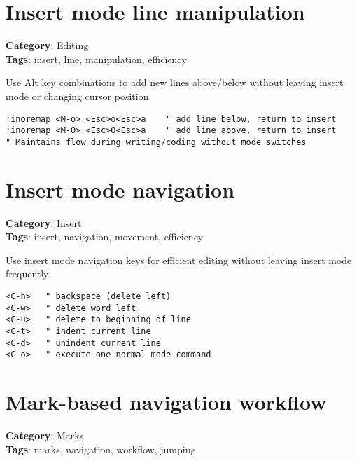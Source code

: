{{{{\section{Insert mode line manipulation}

\textbf{Category}: Editing\\ \textbf{Tags}: insert, line, manipulation, efficiency
\vspace{0.5cm}

Use Alt key combinations to add new lines above/below without leaving insert mode or changing cursor position.

\begin{Exa*}{}
\begin{Verbatim}[fontsize=\footnotesize, breaklines, breakanywhere]
:inoremap <M-o> <Esc>o<Esc>a    " add line below, return to insert
:inoremap <M-O> <Esc>O<Esc>a    " add line above, return to insert
" Maintains flow during writing/coding without mode switches
\end{Verbatim}
\end{Exa*}

\section{Insert mode navigation}

\textbf{Category}: Insert\\ \textbf{Tags}: insert, navigation, movement, efficiency
\vspace{0.5cm}

Use insert mode navigation keys for efficient editing without leaving insert mode frequently.

\begin{Exa*}{}
\begin{Verbatim}[fontsize=\footnotesize, breaklines, breakanywhere]
<C-h>   " backspace (delete left)
<C-w>   " delete word left  
<C-u>   " delete to beginning of line
<C-t>   " indent current line
<C-d>   " unindent current line
<C-o>   " execute one normal mode command
\end{Verbatim}
\end{Exa*}

\section{Mark-based navigation workflow}

\textbf{Category}: Marks\\ \textbf{Tags}: marks, navigation, workflow, jumping
\vspace{0.5cm}

}}}}
